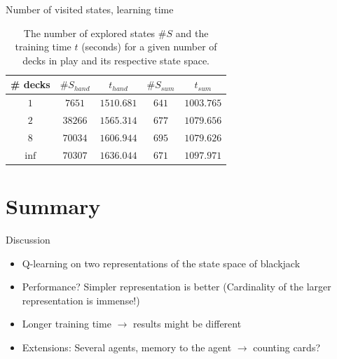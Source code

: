 \begin{frame}{Number of visited states, learning time}
\begin{table}[h!]
\centering
 \begin{tabular}{c|cc|cc}
  \# decks & $\#S_{hand}$ & $t_{hand}$ & $\#S_{sum}$ &  $t_{sum}$  \\
  \hline 
  $1$ & $7651$ & $1510.681$ & $641$ & $1003.765$ \\
  $2$ & $38266$ & $1565.314$ & $677$ & $1079.656$ \\
  $8$ & $70034$ & $1606.944$ & $695$ & $1079.626$ \\
  $\inf$ & $70307$ & $1636.044$ & $671$ & $1097.971$ 
 \end{tabular} 
 \caption{The number of explored states $\#S$ and the training time $t$ (seconds) for a given number of decks in play and its respective state space.\label{tab:state_visited}}
\end{table}
\end{frame}

\section{Summary}

\begin{frame}{Discussion}

\begin{itemize}
 \item Q-learning on two representations of the state space of blackjack
 \item Performance? Simpler representation is better (Cardinality of the larger representation is immense!)
 \item Longer training time $\rightarrow$ results might be different 
 \item Extensions: Several agents, memory to the agent $\rightarrow$ counting cards? 
\end{itemize}

\end{frame}